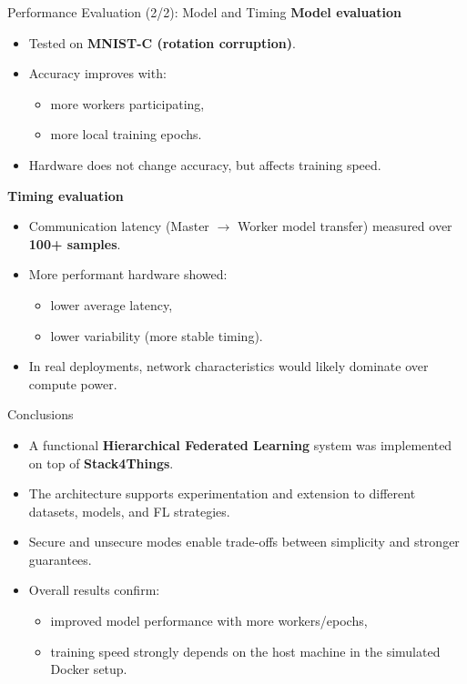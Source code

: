 \documentclass[aspectratio=169]{beamer}
\begin{document}
\begin{frame}{Performance Evaluation (2/2): Model and Timing}
\textbf{Model evaluation}
\begin{itemize}
  \item Tested on \textbf{MNIST-C (rotation corruption)}.
  \item Accuracy improves with:
  \begin{itemize}
    \item more workers participating,
    \item more local training epochs.
  \end{itemize}
  \item Hardware does not change accuracy, but affects training speed.
\end{itemize}

\vspace{0.6em}
\textbf{Timing evaluation}
\begin{itemize}
  \item Communication latency (Master $\rightarrow$ Worker model transfer) measured over \textbf{100+ samples}.
  \item More performant hardware showed:
  \begin{itemize}
    \item lower average latency,
    \item lower variability (more stable timing).
  \end{itemize}
  \item In real deployments, network characteristics would likely dominate over compute power.
\end{itemize}
\end{frame}

\begin{frame}{Conclusions}
\begin{itemize}
  \item A functional \textbf{Hierarchical Federated Learning} system was implemented on top of \textbf{Stack4Things}.
  \item The architecture supports experimentation and extension to different datasets, models, and FL strategies.
  \item Secure and unsecure modes enable trade-offs between simplicity and stronger guarantees.
  \item Overall results confirm:
  \begin{itemize}
    \item improved model performance with more workers/epochs,
    \item training speed strongly depends on the host machine in the simulated Docker setup.
  \end{itemize}
\end{itemize}
\end{frame}
\end{document}
